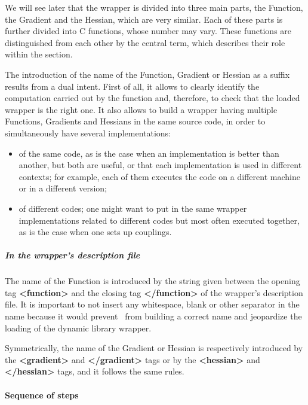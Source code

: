We will see later that the wrapper is divided into three main parts, the Function, the Gradient and the Hessian, which are very similar. Each of these parts is further divided into C functions, whose number may vary. These functions are distinguished from each other by the central term, which describes their role within the section.

The introduction of the name of the Function, Gradient or Hessian as a suffix results from a dual intent. First of all, it allows to clearly identify the computation carried out by the function and, therefore, to check that the loaded wrapper is the right one. It also allows to build a wrapper having multiple Functions, Gradients and Hessians in the same source code, in order to simultaneously have several implementations:
\begin{itemize}
\item of the same code, as is the case when an implementation is better than another, but both are useful, or that each implementation is used in different contexts; for example, each of them executes the code on a different machine or in a different version;
\item of different codes; one might want to put in the same wrapper implementations related to different codes but most often executed together, as is the case when one sets up couplings.
\end{itemize}

\subparagraph{In the wrapper's description file}

The name of the Function is introduced by the string given between the opening tag {\bf <function>} and the closing tag {\bf </function>} of the wrapper's description file. It is important to not insert any whitespace, blank or other separator in the name because it would prevent \OT\ from building a correct name and jeopardize the loading of the dynamic library wrapper.

Symmetrically, the name of the Gradient or Hessian is respectively introduced by the {\bf <gradient>} and {\bf </gradient>} tags or by the {\bf <hessian>} and {\bf </hessian>} tags, and it follows the same rules.

\paragraph{Sequence of steps}

